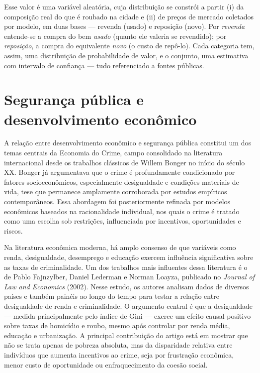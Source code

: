 \documentclass[11pt,a4paper]{article}
\begin{document}
Esse valor é uma variável aleatória, cuja distribuição se constrói a partir (i) da composição real
do que é roubado na cidade e (ii) de preços de mercado coletados por modelo, em duas bases ---
revenda (usado) e reposição (novo). Por \emph{revenda} entende-se a compra do bem \emph{usado}
(quanto ele valeria se revendido); por \emph{reposição}, a compra do equivalente \emph{novo} (o
custo de repô-lo). Cada categoria tem, assim, uma distribuição de probabilidade de valor, e o
conjunto, uma estimativa com intervalo de confiança --- tudo referenciado a fontes públicas.

\section{Segurança pública e desenvolvimento econômico}\label{sec:economia}
A relação entre desenvolvimento econômico e segurança pública constitui um dos temas centrais da
Economia do Crime, campo consolidado na literatura internacional desde os trabalhos clássicos de
Willem Bonger no início do século XX. Bonger já argumentava que o crime é profundamente condicionado
por fatores socioeconômicos, especialmente desigualdade e condições materiais de vida, tese que
permanece amplamente corroborada por estudos empíricos contemporâneos. Essa abordagem foi
posteriormente refinada por modelos econômicos baseados na racionalidade individual, nos quais o
crime é tratado como uma escolha sob restrições, influenciada por incentivos, oportunidades e riscos.

Na literatura econômica moderna, há amplo consenso de que variáveis como renda, desigualdade,
desemprego e educação exercem influência significativa sobre as taxas de criminalidade. Um dos
trabalhos mais influentes dessa literatura é o de Pablo Fajnzylber, Daniel Lederman e Norman Loayza,
publicado no \emph{Journal of Law and Economics} (2002). Nesse estudo, os autores analisam dados de
diversos países e também painéis ao longo do tempo para testar a relação entre desigualdade de renda
e criminalidade. O argumento central é que a desigualdade --- medida principalmente pelo índice de
Gini --- exerce um efeito causal positivo sobre taxas de homicídio e roubo, mesmo após controlar por
renda média, educação e urbanização. A principal contribuição do artigo está em mostrar que não se
trata apenas de pobreza absoluta, mas da disparidade relativa entre indivíduos que aumenta
incentivos ao crime, seja por frustração econômica, menor custo de oportunidade ou enfraquecimento
da coesão social.
\end{document}
